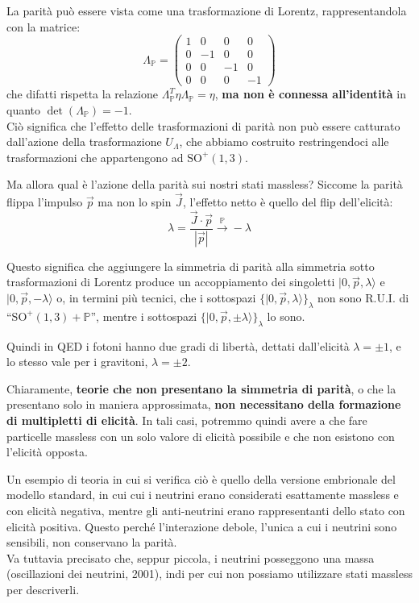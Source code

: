 \documentclass[../main.tex]{subfiles}
\begin{document}
La parità può essere vista come una trasformazione di Lorentz, rappresentandola con la matrice:
\[
\Lambda_\mathbb{P} = 
\begin{pmatrix}
    1   &   0   &   0   &   0\\
    0   &   -1   &   0   &   0\\
    0   &   0   &   -1   &   0\\
    0   &   0   &   0   &   -1
\end{pmatrix}
\]
che difatti rispetta la relazione \(\Lambda_\mathbb{P}^T \eta \Lambda_\mathbb{P} = \eta\), \textbf{ma non è connessa all'identità} in quanto \(\det(\Lambda_\mathbb{P}) = -1\).\\
Ciò significa che l'effetto delle trasformazioni di parità non può essere catturato dall'azione della trasformazione $U_\Lambda$, che abbiamo costruito restringendoci alle trasformazioni che appartengono ad $\text{SO}^+(1,3)$.

Ma allora qual è l'azione della parità sui nostri stati massless? Siccome la parità flippa l'impulso $\Vec{p}$ ma non lo spin $\Vec{J}$, l'effetto netto è quello del flip dell'elicità:
\[
\boxed{\lambda = \frac{\Vec J\cdot\Vec{p}}{|\Vec{p}|} \xrightarrow[]{\mathbb P} -\lambda}
\]

Questo significa che aggiungere la simmetria di parità alla simmetria sotto trasformazioni di Lorentz produce un accoppiamento dei singoletti \(|0,\Vec{p},\lambda\rangle\) e \(|0,\Vec{p},-\lambda\rangle\) o, in termini più tecnici, che i sottospazi \(\big\{|0,\Vec{p},\lambda\rangle\big\}_\lambda\) non sono R.U.I. di “$\text{SO}^+(1,3)+\mathbb P$”, mentre i sottospazi  \(\big\{|0,\Vec{p},\pm\lambda\rangle\big\}_\lambda\) lo sono.

Quindi in QED i fotoni hanno due gradi di libertà, dettati dall'elicità $\lambda = \pm1$, e lo stesso vale per i gravitoni, $\lambda = \pm 2$.

Chiaramente, \textbf{teorie che non presentano la simmetria di parità}, o che la presentano solo in maniera approssimata, \textbf{non necessitano della formazione di multipletti di elicità}. In tali casi, potremmo quindi avere a che fare particelle massless con un solo valore di elicità possibile e che non esistono con l'elicità opposta.

Un esempio di teoria in cui si verifica ciò è quello della versione embrionale del modello standard, in cui cui i neutrini erano considerati esattamente massless e con elicità negativa, mentre gli anti-neutrini erano rappresentanti dello stato con elicità positiva. Questo perché l'interazione debole, l'unica a cui i neutrini sono sensibili, non conservano la parità.\\
Va tuttavia precisato che, seppur piccola, i neutrini posseggono una massa (oscillazioni dei neutrini, 2001), indi per cui non possiamo utilizzare stati massless per descriverli.
\end{document}
